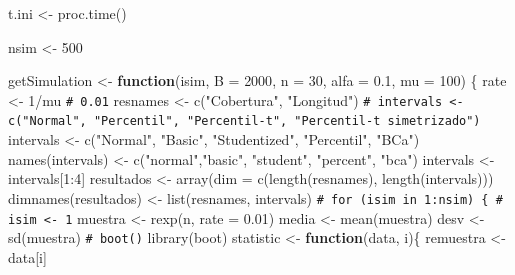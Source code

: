 \documentclass[
  10pt,
]{book}
\newenvironment{Shaded}{\begin{snugshade}}{\end{snugshade}}
\newcommand{\AttributeTok}[1]{\textcolor[rgb]{0.77,0.63,0.00}{#1}}
\newcommand{\CommentTok}[1]{\textcolor[rgb]{0.56,0.35,0.01}{\textit{#1}}}
\newcommand{\ControlFlowTok}[1]{\textcolor[rgb]{0.13,0.29,0.53}{\textbf{#1}}}
\newcommand{\DecValTok}[1]{\textcolor[rgb]{0.00,0.00,0.81}{#1}}
\newcommand{\FloatTok}[1]{\textcolor[rgb]{0.00,0.00,0.81}{#1}}
\newcommand{\FunctionTok}[1]{\textcolor[rgb]{0.00,0.00,0.00}{#1}}
\newcommand{\NormalTok}[1]{#1}
\newcommand{\OtherTok}[1]{\textcolor[rgb]{0.56,0.35,0.01}{#1}}
\newcommand{\SpecialCharTok}[1]{\textcolor[rgb]{0.00,0.00,0.00}{#1}}
\newcommand{\StringTok}[1]{\textcolor[rgb]{0.31,0.60,0.02}{#1}}
\theoremstyle{break}
\theoremstyle{nonumberplain}
\renewcommand{\CommentTok}[1]{\textcolor[rgb]{0.41,0.41,0.41}{\texttt{#1}}}
\begin{document}
\begin{Shaded}
\begin{Highlighting}[]
\NormalTok{t.ini }\OtherTok{\textless{}{-}} \FunctionTok{proc.time}\NormalTok{()}

\NormalTok{nsim }\OtherTok{\textless{}{-}} \DecValTok{500}

\NormalTok{getSimulation }\OtherTok{\textless{}{-}} \ControlFlowTok{function}\NormalTok{(isim, }\AttributeTok{B =} \DecValTok{2000}\NormalTok{, }\AttributeTok{n =} \DecValTok{30}\NormalTok{, }\AttributeTok{alfa =} \FloatTok{0.1}\NormalTok{, }\AttributeTok{mu =} \DecValTok{100}\NormalTok{) \{}
\NormalTok{    rate }\OtherTok{\textless{}{-}} \DecValTok{1}\SpecialCharTok{/}\NormalTok{mu }\CommentTok{\# 0.01}
\NormalTok{    resnames }\OtherTok{\textless{}{-}} \FunctionTok{c}\NormalTok{(}\StringTok{"Cobertura"}\NormalTok{, }\StringTok{"Longitud"}\NormalTok{)}
    \CommentTok{\# intervals \textless{}{-} c("Normal", "Percentil", "Percentil{-}t", "Percentil{-}t simetrizado")}
\NormalTok{    intervals }\OtherTok{\textless{}{-}} \FunctionTok{c}\NormalTok{(}\StringTok{"Normal"}\NormalTok{, }\StringTok{"Basic"}\NormalTok{, }\StringTok{"Studentized"}\NormalTok{, }\StringTok{"Percentil"}\NormalTok{, }\StringTok{"BCa"}\NormalTok{)}
    \FunctionTok{names}\NormalTok{(intervals) }\OtherTok{\textless{}{-}} \FunctionTok{c}\NormalTok{(}\StringTok{"normal"}\NormalTok{,}\StringTok{"basic"}\NormalTok{, }\StringTok{"student"}\NormalTok{, }\StringTok{"percent"}\NormalTok{, }\StringTok{"bca"}\NormalTok{)}
\NormalTok{    intervals }\OtherTok{\textless{}{-}}\NormalTok{ intervals[}\DecValTok{1}\SpecialCharTok{:}\DecValTok{4}\NormalTok{]}
\NormalTok{    resultados }\OtherTok{\textless{}{-}} \FunctionTok{array}\NormalTok{(}\AttributeTok{dim =} \FunctionTok{c}\NormalTok{(}\FunctionTok{length}\NormalTok{(resnames), }\FunctionTok{length}\NormalTok{(intervals)))}
    \FunctionTok{dimnames}\NormalTok{(resultados) }\OtherTok{\textless{}{-}} \FunctionTok{list}\NormalTok{(resnames, intervals)}
    \CommentTok{\# for (isim in 1:nsim) \{ \# isim \textless{}{-} 1}
\NormalTok{    muestra }\OtherTok{\textless{}{-}} \FunctionTok{rexp}\NormalTok{(n, }\AttributeTok{rate =} \FloatTok{0.01}\NormalTok{)}
\NormalTok{    media }\OtherTok{\textless{}{-}} \FunctionTok{mean}\NormalTok{(muestra)}
\NormalTok{    desv }\OtherTok{\textless{}{-}} \FunctionTok{sd}\NormalTok{(muestra)}
    \CommentTok{\# boot()}
    \FunctionTok{library}\NormalTok{(boot)}
\NormalTok{    statistic }\OtherTok{\textless{}{-}} \ControlFlowTok{function}\NormalTok{(data, i)\{}
\NormalTok{      remuestra }\OtherTok{\textless{}{-}}\NormalTok{ data[i]}

\end{Highlighting}
\end{Shaded}
\end{document}
